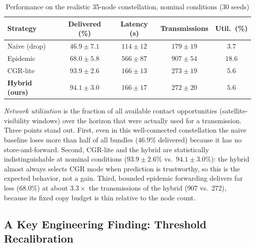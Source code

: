 \documentclass[10pt,twocolumn]{article}
\begin{document}
\begin{table}[t]
\centering
\footnotesize
\setlength{\tabcolsep}{3pt}
\caption{Performance on the realistic 35-node constellation, nominal conditions (30 seeds)}
\label{tab:baseline}
\begin{tabular}{lcccc}
\toprule
Strategy & Delivered (\%) & Latency (s) & Transmissions & Util.\ (\%) \\
\midrule
Naive (drop) & $46.9 \pm 7.1$ & $114 \pm 12$ & $179 \pm 19$ & $3.7$ \\
Epidemic & $68.0 \pm 5.8$ & $566 \pm 87$ & $907 \pm 54$ & $18.6$ \\
CGR-lite & $93.9 \pm 2.6$ & $166 \pm 13$ & $273 \pm 19$ & $5.6$ \\
\textbf{Hybrid (ours)} & $94.1 \pm 3.0$ & $166 \pm 17$ & $272 \pm 20$ & $5.6$ \\
\bottomrule
\end{tabular}
\end{table}

\emph{Network utilization} is the fraction of all available contact opportunities (satellite-visibility windows) over the horizon that were actually used for a transmission. Three points stand out. First, even in this well-connected constellation the naive baseline loses more than half of all bundles (46.9\% delivered) because it has no store-and-forward. Second, CGR-lite and the hybrid are statistically indistinguishable at nominal conditions ($93.9 \pm 2.6$\% vs.\ $94.1 \pm 3.0$\%): the hybrid almost always selects CGR mode when prediction is trustworthy, so this is the expected behavior, not a gain. Third, bounded epidemic forwarding delivers far less (68.0\%) at about $3.3\times$ the transmissions of the hybrid (907 vs.\ 272), because its fixed copy budget is thin relative to the node count.

\subsection{A Key Engineering Finding: Threshold Recalibration}
\label{sec:recalibration}
\end{document}
